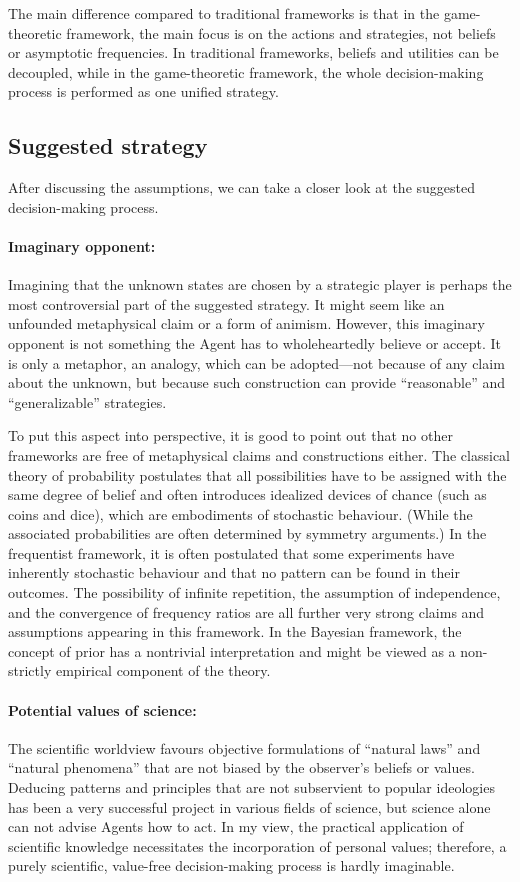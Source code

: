 \documentclass{article}
\begin{document}
The main difference compared to traditional frameworks is that in the game-theoretic framework, the main focus is on the actions and strategies, not beliefs or asymptotic frequencies.
In traditional frameworks, beliefs and utilities can be decoupled, while in the game-theoretic framework, the whole decision-making process is performed as one unified strategy.

\subsection*{Suggested strategy}

After discussing the assumptions, we can take a closer look at the suggested decision-making process.

\paragraph{Imaginary opponent:}
Imagining that the unknown states are chosen by a strategic player is perhaps the most controversial part of the suggested strategy. It might seem like an unfounded metaphysical claim or a form of animism. However, this imaginary opponent is not something the Agent has to wholeheartedly believe or accept. It is only a metaphor, an analogy, which can be adopted—not because of any claim about the unknown, but because such construction can provide ``reasonable'' and ``generalizable'' strategies.

To put this aspect into perspective, it is good to point out that no other frameworks are free of metaphysical claims and constructions either.
The classical theory of probability postulates that all possibilities have to be assigned with the same degree of belief and often introduces idealized devices of chance (such as coins and dice), which are embodiments of stochastic behaviour. (While the associated probabilities are often determined by symmetry arguments.)
In the frequentist framework, it is often postulated that some experiments have inherently stochastic behaviour and that no pattern can be found in their outcomes. The possibility of infinite repetition, the assumption of independence, and the convergence of frequency ratios are all further very strong claims and assumptions appearing in this framework.
In the Bayesian framework, the concept of prior has a nontrivial interpretation and might be viewed as a non-strictly empirical component of the theory.

\paragraph{Potential values of science:}
The scientific worldview favours objective formulations of ``natural laws'' and ``natural phenomena'' that are not biased by the observer’s beliefs or values. Deducing patterns and principles that are not subservient to popular ideologies has been a very successful project in various fields of science, but science alone can not advise Agents how to act.
In my view, the practical application of scientific knowledge necessitates the incorporation of personal values; therefore, a purely scientific, value-free decision-making process is hardly imaginable.
\end{document}

